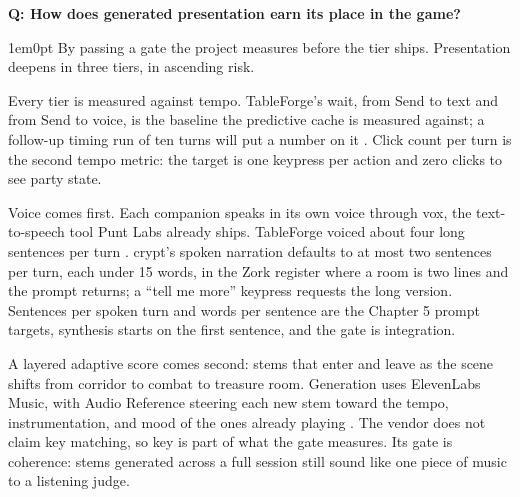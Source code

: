 \documentclass[11pt,letterpaper]{article}
\newcounter{faqnum}
\newenvironment{faqpair}[1]{%
  \needspace{4\baselineskip}\vspace{0.5em}\refstepcounter{faqnum}%
  \noindent\textbf{\color{SectionBlue}Q\thefaqnum: #1}\par\nopagebreak[4]%
  \vspace{0.2em}\begin{adjustwidth}{1em}{0pt}\setlength{\parindent}{0pt}%
}{\end{adjustwidth}\vspace{0.5em}}
\begin{document}
\begin{faqpair}{How does generated presentation earn its place in the game?}\label{faq:presentation}
By passing a gate the project measures before the tier ships. Presentation
deepens in three tiers, in ascending risk.

Every tier is measured against tempo. TableForge's wait, from Send to text
and from Send to voice, is the baseline the predictive cache is measured
against; a follow-up timing run of ten turns will put a number on it
\cite{freeman2026tableforgehandson}. Click count per turn is the second
tempo metric: the target is one keypress per action and zero clicks to see
party state.

Voice comes first. Each companion speaks in its own voice through vox, the
text-to-speech tool Punt Labs already ships. TableForge voiced about four
long sentences per turn \cite{freeman2026tableforgehandson}. crypt's spoken
narration defaults to at most two sentences per turn, each under 15 words,
in the Zork register where a room is two lines and the prompt returns; a
``tell me more'' keypress requests the long version. Sentences per spoken
turn and words per sentence are the Chapter 5 prompt targets, synthesis
starts on the first sentence, and the gate is integration.

A layered adaptive score comes second: stems that enter and leave as the
scene shifts from corridor to combat to treasure room. Generation uses
ElevenLabs Music, with Audio Reference steering each new stem toward the
tempo, instrumentation, and mood of the ones already playing
\cite{elevenlabs2026music}. The vendor does not claim key matching, so
key is part of what the gate measures. Its gate is coherence: stems
generated across a full session still sound like one piece of music to a
listening judge.


\end{faqpair}
\end{document}
